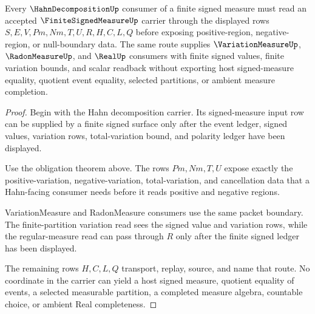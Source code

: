 \begin{theorem}
\label{thm:finite-signed-measure-hahn-consumer-route}
Every $\HahnDecompositionUp$ consumer of a finite signed measure must read an accepted $\FiniteSignedMeasureUp$ carrier through the displayed rows $S,E,V,Pm,Nm,T,U,R,H,C,L,Q$ before exposing positive-region, negative-region, or null-boundary data. The same route supplies $\VariationMeasureUp$, $\RadonMeasureUp$, and $\RealUp$ consumers with finite signed values, finite variation bounds, and scalar readback without exporting host signed-measure equality, quotient event equality, selected partitions, or ambient measure completion.
\end{theorem}
\begin{proof}
Begin with the Hahn decomposition carrier. Its signed-measure input row can be supplied by a finite signed surface only after the event ledger, signed values, variation rows, total-variation bound, and polarity ledger have been displayed.

Use the obligation theorem above. The rows $Pm,Nm,T,U$ expose exactly the positive-variation, negative-variation, total-variation, and cancellation data that a Hahn-facing consumer needs before it reads positive and negative regions.

VariationMeasure and RadonMeasure consumers use the same packet boundary. The finite-partition variation read sees the signed value and variation rows, while the regular-measure read can pass through $R$ only after the finite signed ledger has been displayed.

The remaining rows $H,C,L,Q$ transport, replay, source, and name that route. No coordinate in the carrier can yield a host signed measure, quotient equality of events, a selected measurable partition, a completed measure algebra, countable choice, or ambient Real completeness.
\end{proof}


